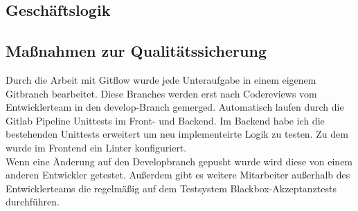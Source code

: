 \subsection{Geschäftslogik}
\label{geschaeftslogik}

\subsection{Maßnahmen zur Qualitätssicherung}
\label{qualitaetssicherung}
Durch die Arbeit mit Gitflow wurde jede Unteraufgabe in einem eigenem Gitbranch bearbeitet. Diese Branches werden erst nach Codereviews vom Entwicklerteam in den develop-Branch gemerged.  Automatisch laufen durch die Gitlab Pipeline Unittests im Front- und Backend. Im Backend habe ich die bestehenden Unittests erweitert um neu implementeirte Logik zu testen. Zu dem wurde im Frontend ein \gls{Linter} konfiguriert.\\
Wenn eine Änderung auf den Developbranch gepusht wurde wird diese von einem anderen Entwickler getestet. Außerdem gibt es weitere Mitarbeiter außerhalb des Entwicklerteams die regelmäßig auf dem Testsystem Blackbox-Akzeptanztests durchführen.